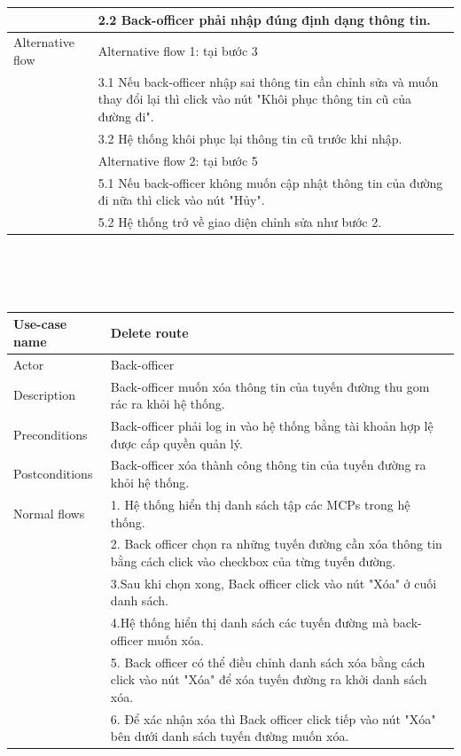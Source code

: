 \documentclass[a4paper]{article}
\begin{document}
\begin{enumerate}
\begin{enumerate}
\begin{tabular}{|p{3cm} | p{10cm}|}
        &2.2 Back-officer phải nhập đúng định dạng thông tin.\\
        \hline
        Alternative flow & Alternative flow 1: tại bước 3 \\
        &3.1 Nếu back-officer nhập sai thông tin cần chỉnh sửa và muốn thay đổi lại thì click vào nút "Khôi phục thông tin cũ của đường đi". \\
        &3.2 Hệ thống khôi phục lại thông tin cũ trước khi nhập. \\
        &Alternative flow 2: tại bước 5 \\
        &5.1 Nếu back-officer không muốn cập nhật thông tin của đường đi nữa thì click vào nút "Hủy". \\
        &5.2 Hệ thống trở về giao diện chỉnh sửa như bước 2.\\
        \hline
    \end{tabular}
    \\ \\ \\
    \begin{tabular}{|p{3cm}|p{10cm}|}
         \hline
         Use-case name & \textbf{Delete route} \\
         \hline
         Actor & Back-officer \\ 
         \hline
         Description & Back-officer muốn xóa thông tin của tuyến đường thu gom rác ra khỏi hệ thống. \\
         \hline
         Preconditions & Back-officer phải log in vào hệ thống bằng tài khoản hợp lệ được cấp quyền quản lý. \\
         \hline
         Postconditions & Back-officer xóa thành công thông tin của tuyến đường ra khỏi hệ thống. \\
         \hline
         Normal flows  
         &1. Hệ thống hiển thị danh sách tập các MCPs trong hệ thống. \\
         &2. Back officer chọn ra những tuyến đường cần xóa thông tin bằng cách click vào checkbox của từng tuyến đường. \\
         &3.Sau khi chọn xong, Back officer click vào nút "Xóa" ở cuối danh sách. \\
         &4.Hệ thống hiển thị danh sách các tuyến đường mà back-officer muốn xóa. \\
         &5. Back officer có thể điều chỉnh danh sách xóa bằng cách click vào nút "Xóa" để xóa tuyến đường ra khởi danh sách xóa.\\
         &6. Để xác nhận xóa thì Back officer click tiếp vào nút "Xóa" bên dưới danh sách tuyến đường muốn xóa.\\

\end{tabular}
\end{enumerate}
\end{enumerate}
\end{document}

